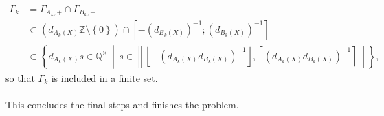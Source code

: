 \begin{solution}
\begin{align*}
        \Gamma_k &= \Gamma_{A_k,+} \cap \Gamma_{B_k,-}\\ &\subset \left( d_{A_k(X)} \mathbb{Z} \setminus \left\{ 0 \right\} \right) \cap \left[ -\left( d_{B_k(X)} \right)^{-1}; \left( d_{B_k(X)} \right)^{-1} \right] \\
        &\subset \left\{d_{A_k(X)} s \in \mathbb{Q}^{\times} \,\middle|\, s \in \left\llbracket \left\lfloor -\left( d_{A_k(X)} d_{B_k(X)} \right)^{-1} \right\rfloor, \left\lceil \left( d_{A_k(X)} d_{B_k(X)} \right)^{-1} \right\rceil \right\rrbracket\right\},
    \end{align*}
    so that \( \Gamma_k \) is included in a finite set.
    \\\\
    This concludes the final steps and finishes the problem.
\end{solution}
